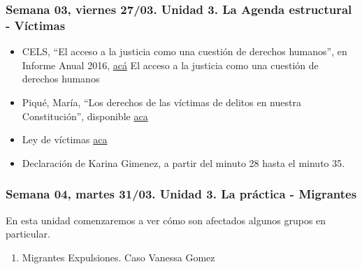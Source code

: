 \documentclass[
]{article}
\providecommand{\tightlist}{%
  \setlength{\itemsep}{0pt}\setlength{\parskip}{0pt}}
\begin{document}
\subsubsection{Semana 03, viernes 27/03. Unidad 3. La Agenda estructural
-
Víctimas}\label{semana-03-viernes-2703.-unidad-3.-la-agenda-estructural---vuxedctimas}

\begin{itemize}
\item
  CELS, ``El acceso a la justicia como una cuestión de derechos
  humanos'', en Informe Anual 2016,
  \href{https://drive.google.com/file/d/1qH6DsnHctmesy6nje2f5NgCyowQ0PkyM/view?usp=sharing}{acá}
  El acceso a la justicia como una cuestión de derechos humanos
\item
  Piqué, María, ``Los derechos de las víctimas de delitos en nuestra
  Constitución'', disponible
  \href{https://drive.google.com/file/d/1NaUqgIjcAosZx6OCPuJzcdG3sbKrqfaC/view?usp=sharing}{aca}
\item
  Ley de víctimas
  \href{https://servicios.infoleg.gob.ar/infolegInternet/anexos/275000-279999/276819/norma.htm}{aca}
\item
  Declaración de Karina Gimenez, a partir del minuto 28 hasta el minuto
  35.
\end{itemize}

\subsubsection{Semana 04, martes 31/03. Unidad 3. La práctica -
Migrantes}\label{semana-04-martes-3103.-unidad-3.-la-pruxe1ctica---migrantes}

En esta unidad comenzaremos a ver cómo son afectados algunos grupos en
particular.

\begin{enumerate}
\def\labelenumi{\alph{enumi}.}
\tightlist
\item
  Migrantes Expulsiones. Caso Vanessa Gomez
\end{enumerate}
\end{document}
